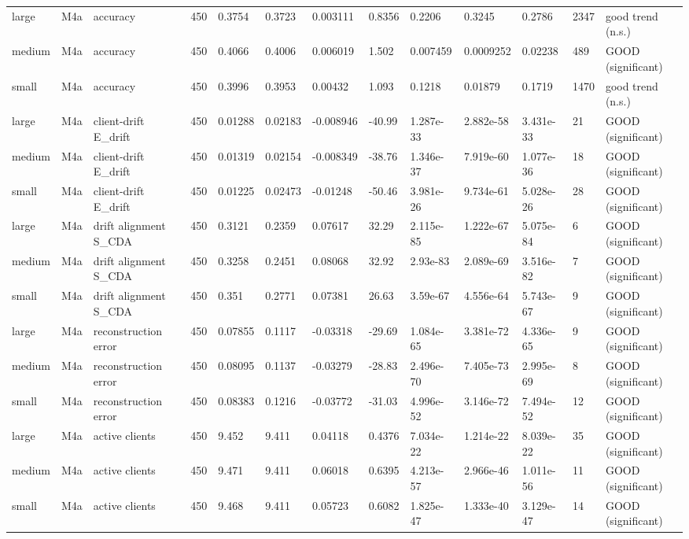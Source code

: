 \begin{table}[t]
\begin{tabular}{lllllllllllll}
large & M4a & accuracy & 450 & 0.3754 & 0.3723 & 0.003111 & 0.8356 & 0.2206 & 0.3245 & 0.2786 & 2347 & good trend (n.s.) \\
medium & M4a & accuracy & 450 & 0.4066 & 0.4006 & 0.006019 & 1.502 & 0.007459 & 0.0009252 & 0.02238 & 489 & GOOD (significant) \\
small & M4a & accuracy & 450 & 0.3996 & 0.3953 & 0.00432 & 1.093 & 0.1218 & 0.01879 & 0.1719 & 1470 & good trend (n.s.) \\
large & M4a & client-drift E\_drift & 450 & 0.01288 & 0.02183 & -0.008946 & -40.99 & 1.287e-33 & 2.882e-58 & 3.431e-33 & 21 & GOOD (significant) \\
medium & M4a & client-drift E\_drift & 450 & 0.01319 & 0.02154 & -0.008349 & -38.76 & 1.346e-37 & 7.919e-60 & 1.077e-36 & 18 & GOOD (significant) \\
small & M4a & client-drift E\_drift & 450 & 0.01225 & 0.02473 & -0.01248 & -50.46 & 3.981e-26 & 9.734e-61 & 5.028e-26 & 28 & GOOD (significant) \\
large & M4a & drift alignment S\_CDA & 450 & 0.3121 & 0.2359 & 0.07617 & 32.29 & 2.115e-85 & 1.222e-67 & 5.075e-84 & 6 & GOOD (significant) \\
medium & M4a & drift alignment S\_CDA & 450 & 0.3258 & 0.2451 & 0.08068 & 32.92 & 2.93e-83 & 2.089e-69 & 3.516e-82 & 7 & GOOD (significant) \\
small & M4a & drift alignment S\_CDA & 450 & 0.351 & 0.2771 & 0.07381 & 26.63 & 3.59e-67 & 4.556e-64 & 5.743e-67 & 9 & GOOD (significant) \\
large & M4a & reconstruction error & 450 & 0.07855 & 0.1117 & -0.03318 & -29.69 & 1.084e-65 & 3.381e-72 & 4.336e-65 & 9 & GOOD (significant) \\
medium & M4a & reconstruction error & 450 & 0.08095 & 0.1137 & -0.03279 & -28.83 & 2.496e-70 & 7.405e-73 & 2.995e-69 & 8 & GOOD (significant) \\
small & M4a & reconstruction error & 450 & 0.08383 & 0.1216 & -0.03772 & -31.03 & 4.996e-52 & 3.146e-72 & 7.494e-52 & 12 & GOOD (significant) \\
large & M4a & active clients & 450 & 9.452 & 9.411 & 0.04118 & 0.4376 & 7.034e-22 & 1.214e-22 & 8.039e-22 & 35 & GOOD (significant) \\
medium & M4a & active clients & 450 & 9.471 & 9.411 & 0.06018 & 0.6395 & 4.213e-57 & 2.966e-46 & 1.011e-56 & 11 & GOOD (significant) \\
small & M4a & active clients & 450 & 9.468 & 9.411 & 0.05723 & 0.6082 & 1.825e-47 & 1.333e-40 & 3.129e-47 & 14 & GOOD (significant) \\

\end{tabular}
\end{table}
